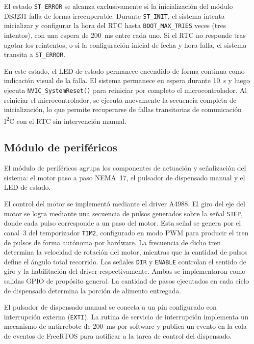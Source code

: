 El estado \texttt{ST\_ERROR} se alcanza exclusivamente si la inicialización
del módulo DS3231 falla de forma irrecuperable. Durante \texttt{ST\_INIT}, el
sistema intenta inicializar y configurar la hora del RTC hasta
\texttt{BOOT\_MAX\_TRIES} veces (tres intentos), con una espera de 200~ms
entre cada uno. Si el RTC no responde tras agotar los reintentos, o si la
configuración inicial de fecha y hora falla, el sistema transita a
\texttt{ST\_ERROR}.

En este estado, el LED de estado permanece encendido de forma continua como
indicación visual de la falla. El sistema permanece en espera durante 10~s y luego ejecuta
\texttt{NVIC\_SystemReset()} para reiniciar por completo el microcontrolador.
Al reiniciar el microcontrolador, se ejecuta nuevamente la secuencia completa de
inicialización, lo que permite recuperarse de fallas transitorias de comunicación
I\textsuperscript{2}C con el RTC sin intervención manual.

\newpage
\subsection{Módulo de periféricos}

El módulo de periféricos agrupa los componentes de actuación y señalización del
sistema: el motor paso a paso NEMA~17, el pulsador de dispensado manual y el
LED de estado.

El control del motor se implementó mediante el driver A4988. El giro del eje
del motor se logra mediante una secuencia de pulsos generados sobre la señal
\texttt{STEP}, donde cada pulso corresponde a un paso del motor. Esta señal se
genera por el canal~3 del temporizador \texttt{TIM2}, configurado en modo PWM
para producir el tren de pulsos de forma autónoma por hardware. La frecuencia
de dicho tren determina la velocidad de rotación del motor, mientras que la
cantidad de pulsos define el ángulo total recorrido. Las señales \texttt{DIR}
y \texttt{ENABLE} controlan el sentido de giro y la habilitación del driver
respectivamente. Ambas se implementaron como salidas GPIO de propósito general.
La cantidad de pasos ejecutados en cada ciclo de dispensado determina la porción
de alimento entregada.

El pulsador de dispensado manual se conecta a un pin configurado con interrupción
externa (\texttt{EXTI}). La rutina de servicio de interrupción implementa un
mecanismo de antirrebote de 200~ms por software y publica un evento en la cola
de eventos de FreeRTOS para notificar a la tarea de control del
dispensado.

